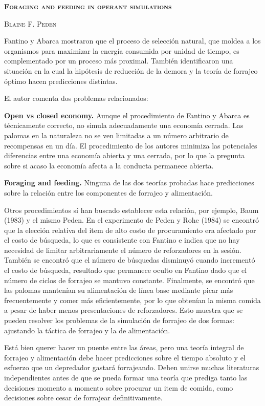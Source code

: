 \documentclass[a4paper,12pt]{article}
\begin{document}
{\scshape\bfseries Foraging and feeding in operant simulations}

{\scshape Blaine F. Peden}

Fantino y Abarca mostraron que el proceso de selección natural, que moldea a los organismos para maximizar la energía consumida por unidad de tiempo, es complementado por un proceso más proximal. También identificaron una situación en la cual la hipótesis de reducción de la demora y la teoría de forrajeo óptimo hacen predicciones distintas. 

El autor comenta dos problemas relacionados:

{\bfseries Open vs closed economy.} Aunque el procedimiento de Fantino y Abarca es técnicamente correcto, no simula adecuadamente una economía cerrada. Las palomas en la naturaleza no se ven limitadas a un número arbitrario de recompensas en un día. El procedimiento de los autores minimiza las potenciales diferencias entre una economía abierta y una cerrada, por lo que la pregunta sobre si acaso la economía afecta a la conducta permanece abierta.

{\bfseries Foraging and feeding.} Ninguna de las dos teorías probadas hace predicciones sobre la relación entre los componentes de forrajeo y alimentación. 

Otros procedimientos sí han buscado establecer esta relación, por ejemplo, Baum (1983) y el mismo Peden. En el experimento de Peden y Rohe (1984) se encontró que la elección relativa del item de alto costo de procuramiento era afectado por el costo de búsqueda, lo que es consistente con Fantino e indica que no hay necesidad de limitar arbitrariamente el número de reforzadores en la sesión. También se encontró que el número de búsquedas disminuyó cuando incrementó el costo de búsqueda, resultado que permanece oculto en Fantino dado que el número de ciclos de forrajeo se mantuvo constante. Finalmente, se encontró que las palomas mantenían su alimentación de línea base mediante picar más frecuentemente y comer más eficientemente, por lo que obtenían la misma comida a pesar de haber menos presentaciones de reforzadores. Esto muestra que se pueden resolver los problemas de la simulación de forrajeo de dos formas: ajustando la táctica de forrajeo y la de alimentación. 

Está bien querer hacer un puente entre las áreas, pero una teoría integral de forrajeo y alimentación debe hacer predicciones sobre el tiempo absoluto y el esfuerzo que un depredador gastará forrajeando. Deben unirse muchas literaturas independientes antes de que se pueda formar una teoría que prediga tanto las decisiones momento a momento sobre procurar un item de comida, como decisiones sobre cesar de forrajear definitivamente.
\end{document}

